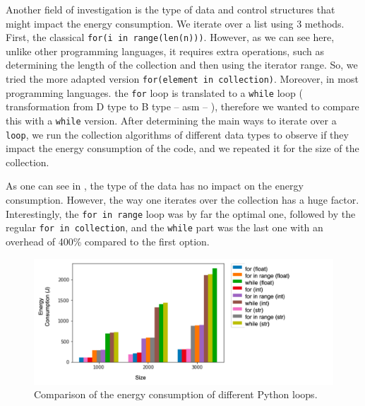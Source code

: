 Another field of investigation is the type of data and control structures that might impact the energy consumption.
We iterate over a list using 3 methods.
First, the classical \texttt{for(i in range(len(n)))}.
However, as we can see here, unlike other programming languages, it requires extra operations, such as determining the length of the collection and then using the iterator range.
So, we tried the more adapted version \texttt{for(element in collection)}.
Moreover, in most programming languages. the \texttt{for} loop is translated to a \texttt{while} loop ( transformation from D type to B type -- asm -- ), therefore we wanted to compare this with a \texttt{while} version.
After determining the main ways to iterate over a \texttt{loop}, we run the collection algorithms of different data types to observe if they impact the energy consumption of the code, and we repeated it for the size of the collection.

As one can see in , the type of the data has no impact on the energy consumption.
However, the way one iterates over the collection has a huge factor.
Interestingly, the \texttt{for in range} loop was by far the optimal one, followed by the regular \texttt{for in collection}, and the \texttt{while} part was the last one with an overhead of 400\% compared to the first option.

\begin{figure}
    \centering
    \includegraphics[width=\linewidth]{imgs/python_iterations}
    \caption{Comparison of the energy consumption of different Python loops.}
    \label{fig:pythonloops}
\end{figure}

